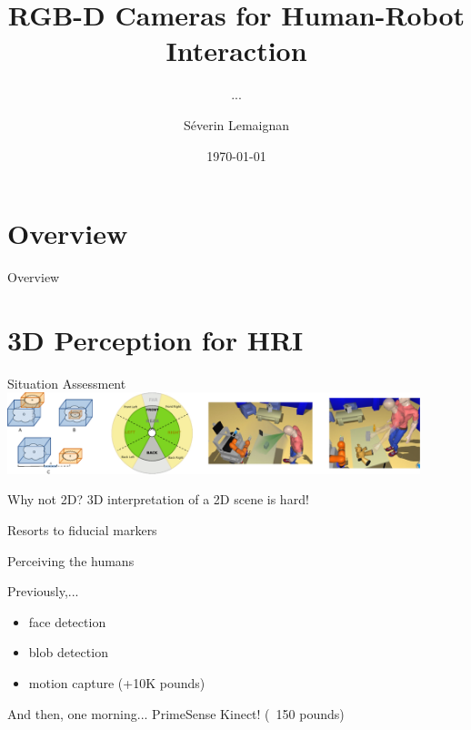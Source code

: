 \documentclass[compress]{beamer}
\title{RGB-D Cameras for Human-Robot Interaction}
\subtitle{...}
\date{\today}
\author{Séverin Lemaignan}
\institute{Centre for Neural Systems and Robotics\\{\Medium Plymouth University}}
\begin{document}


\maketitle

\section*{Overview}
\begin{frame}{Overview}
    \tableofcontents[hideallsubsections]
\end{frame}



\section{3D Perception for HRI}


\begin{frame}{Situation Assessment}
        \centering
        \\
        \vspace*{1em}
        \includegraphics[width=0.9\textwidth]{spark.pdf}
\end{frame}

\begin{frame}{Why not 2D?}
    3D interpretation of a 2D scene is hard!

    Resorts to fiducial markers
\end{frame}

\begin{frame}{Perceiving the humans}

Previously,...

\begin{itemize}
    \item face detection
    \item blob detection
    \item motion capture (+10K pounds)
\end{itemize}

And then, one morning... PrimeSense Kinect! (~150 pounds)

\end{frame}
\end{document}
